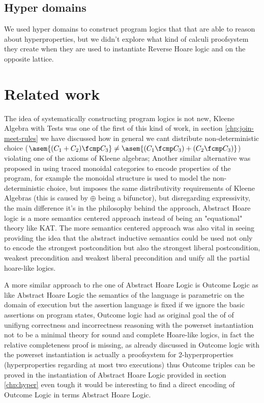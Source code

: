 \subsection{Hyper domains}
We used hyper domains to construct program logics that that are able to reason
about hyperproperties, but we didn't explore what kind of calculi proofsystem 
they create when they are used to instantiate Reverse Hoare logic and on the 
opposite lattice.

\section{Related work}

The idea of systematically constructing program logics is not new, Kleene
Algebra with Tests \cite{Kozen97} was one of the first of this kind of work,
in section \ref{chp:join-meet-rules} we have discussed how in general we
cant distribute non-deterministic choice ($\asem{(C_1 + C_2) \fcmp C_3} \neq
\asem{(C_1 \fcmp C_3) + (C_2 \fcmp C_3)}$) violating one of the axioms of 
Kleene algebras; Another similar alternative was proposed in \cite{Martin06} 
using traced monoidal categories to encode properties of the program, for 
example the monoidal structure is used to model the non-deterministic choice,
but imposes the same distributivity requirements of Kleene Algebras (this is
caused by $\oplus$ being a bifunctor), but disregarding expressivity, the
main difference it's in the philosophy behind the approach, Abstract Hoare logic
is a more semantics centered approach instead of being an "equational" theory
like KAT. The more semantics centered approach was also vital in seeing 
providing the idea that the abstract inductive semantics could be used not only
to encode the strongest postcondition but also the strongest liberal postcondition,
weakest precondition and weakest liberal precondition and unify all the 
partial hoare-like logics.

A more similar approach to rhe one of Abstract Hoare Logic is Outcome Logic 
\cite{Zilberstein23} as like Abstract Hoare Logic the semantics of the language
is parametric on the domain of execution but the assertion language is fixed
if we ignore the basic assertions on program states, Outcome logic had as original 
goal the of of unifiyng correctness and incorrectness reasoning with the powerset 
instantiation not to be a minimal theory for sound and complete Hoare-like 
logics, in fact the relative completeness proof is missing, as already discussed
in \cite{Darnier2023} Outcome logic with the powerset instantiation is actually
a proofsystem for 2-hyperproperties (hyperproperties regarding at most two 
executions) thus Outcome triples can be proved in the instantiation of 
Abstract Hoare Logic provided in section \ref{chp:hyper} even tough it would
be interesting to find a direct encoding of Outcome Logic in terms Abstract 
Hoare Logic.

